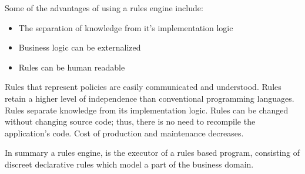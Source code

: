 Some of the advantages of using a rules engine include:
\begin{itemize}
    \item The separation of knowledge from it's implementation logic
    \item Business logic can be externalized
    \item Rules can be human readable
\end{itemize}

Rules that represent policies are easily
communicated and understood.
Rules retain a higher level of independence than
conventional programming languages.
Rules separate knowledge from its implementation
logic.
Rules can be changed without changing source
code; thus, there is no need to recompile the
application's code.
Cost of production and maintenance decreases.


In summary a rules engine, is the executor of a rules based program, consisting of discreet declarative rules which model a part of the business domain.







